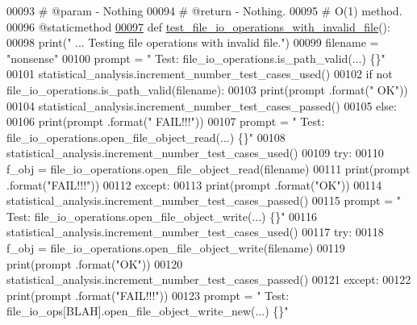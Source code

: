\begin{DoxyCode}
00093     \textcolor{comment}{#   @param - Nothing}
00094     \textcolor{comment}{#   @return - Nothing.}
00095     \textcolor{comment}{#   O(1) method.}
00096     @staticmethod
\hypertarget{file__io__tester_8py_source_l00097}{}\hyperlink{classutilities_1_1file__io__tester_1_1file__io__operations__tester_a847cc701af96fbf9558cdae859f379d6}{00097}     \textcolor{keyword}{def }\hyperlink{classutilities_1_1file__io__tester_1_1file__io__operations__tester_a847cc701af96fbf9558cdae859f379d6}{test\_file\_io\_operations\_with\_invalid\_file}():
00098         print(\textcolor{stringliteral}{" ... Testing file operations with invalid file."})
00099         filename = \textcolor{stringliteral}{"nonsense"}
00100         prompt = \textcolor{stringliteral}{"  Test: file\_io\_operations.is\_path\_valid(...) \{\}"}
00101         statistical\_analysis.increment\_number\_test\_cases\_used()
00102         \textcolor{keywordflow}{if} \textcolor{keywordflow}{not} file\_io\_operations.is\_path\_valid(filename):
00103             print(prompt .format(\textcolor{stringliteral}{"  OK"}))
00104             statistical\_analysis.increment\_number\_test\_cases\_passed()
00105         \textcolor{keywordflow}{else}:
00106             print(prompt .format(\textcolor{stringliteral}{"  FAIL!!!"}))
00107         prompt = \textcolor{stringliteral}{"  Test: file\_io\_operations.open\_file\_object\_read(...) \{\}"}
00108         statistical\_analysis.increment\_number\_test\_cases\_used()
00109         \textcolor{keywordflow}{try}:
00110             f\_obj = file\_io\_operations.open\_file\_object\_read(filename)
00111             print(prompt .format(\textcolor{stringliteral}{"FAIL!!!"}))
00112         \textcolor{keywordflow}{except}:
00113             print(prompt .format(\textcolor{stringliteral}{"OK"}))
00114             statistical\_analysis.increment\_number\_test\_cases\_passed()
00115         prompt = \textcolor{stringliteral}{"  Test: file\_io\_operations.open\_file\_object\_write(...)    \{\}"}
00116         statistical\_analysis.increment\_number\_test\_cases\_used()
00117         \textcolor{keywordflow}{try}:
00118             f\_obj = file\_io\_operations.open\_file\_object\_write(filename)
00119             print(prompt .format(\textcolor{stringliteral}{"OK"}))
00120             statistical\_analysis.increment\_number\_test\_cases\_passed()
00121         \textcolor{keywordflow}{except}:
00122             print(prompt .format(\textcolor{stringliteral}{"FAIL!!!"}))
00123         prompt = \textcolor{stringliteral}{"  Test: file\_io\_ops[BLAH].open\_file\_object\_write\_new(...) \{\}"}

\end{DoxyCode}
